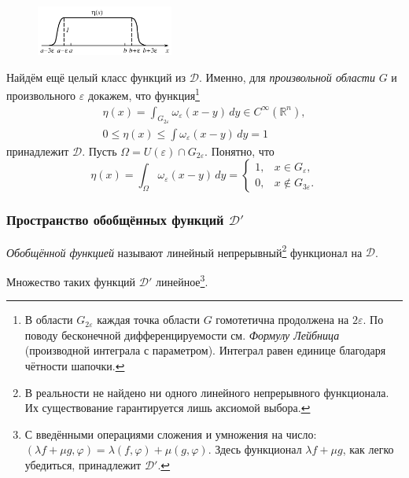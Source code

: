 \begin{figure}
  \centering
  \includegraphics[width=0.4\textwidth]{img/eta(x).png}
\end{figure}
Найдём ещё целый класс функций из $ \mathcal D $.
Именно, для \textsl{произвольной области} $ G $ и произвольного $ \varepsilon $
докажем, что функция\footnote{В области $ G_{2\varepsilon} $ каждая точка
области $ G $ гомотетична продолжена на $ 2\varepsilon $. По поводу бесконечной
дифференцируемости см.
\emph{Формулу Лейбница} (производной интеграла с параметром). Интеграл равен единице благодаря чётности шапочки.} 
\begin{gather*}
  \eta(x) = \int_{G_{2\varepsilon}} \omega_\varepsilon(x-y)\, dy \in
  C^\infty(\mathbb R^n),\\
  0 \leqslant \eta(x) \leqslant \int\omega_\varepsilon(x-y)\, dy = 1
\end{gather*}
принадлежит $ \mathcal D $. Пусть $ \Omega = U(\varepsilon) \cap
G_{2\varepsilon}$.  Понятно, что  
\[
  \eta(x) = \int_{\Omega} \omega_\varepsilon(x - y)\, dy = \begin{cases}
    1, & x \in G_\varepsilon,\\
    0, & x\notin G_{3\varepsilon}.
  \end{cases}
\]

\subsubsection{Пространство обобщённых функций $ \mathcal D' $}
\emph{Обобщённой функцией} называют линейный непрерывный\footnote{В реальности
  не найдено ни одного линейного непрерывного функционала. Их существование
гарантируется лишь аксиомой выбора.} функционал на $
\mathcal D $. 

Множество таких функций $ \mathcal D' $ линейное\footnote{С введёнными
  операциями сложения и умножения на число: $ (\lambda f + \mu g,\varphi) =
\lambda(f,\varphi) + \mu(g,\varphi) $. Здесь функционал $ \lambda f + \mu g $,
как легко убедиться, принадлежит $ \mathcal D' $.}.

